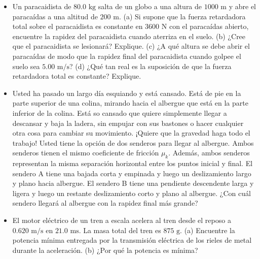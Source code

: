 \documentclass[11pt,a4paper]{article}
\begin{document}
\begin{itemize}
    \item[\textbf{14.}] Un paracaidista de $80.0 \text{ kg}$ salta de un globo a una altura de $1000 \text{ m}$ y abre el paracaídas a una altitud de $200 \text{ m}$. (a) Si supone que la fuerza retardadora total sobre el paracaidista es constante en $3600 \text{ N}$ con el paracaídas abierto, encuentre la rapidez del paracaidista cuando aterriza en el suelo. (b) ¿Cree que el paracaidista se lesionará? Explique. (c) ¿A qué altura se debe abrir el paracaídas de modo que la rapidez final del paracaidista cuando golpee el suelo sea $5.00 \text{ m/s}$? (d) ¿Qué tan real es la suposición de que la fuerza retardadora total es constante? Explique.
    \vspace*{7cm}

    \item[\textbf{15.}] Usted ha pasado un largo día esquiando y está cansado. Está de pie en la parte superior de una colina, mirando hacia el albergue que está en la parte inferior de la colina. Está so cansado que quiere simplemente llegar a descansar y baja la ladera, sin empujar con sus bastones o hacer cualquier otra cosa para cambiar su movimiento. ¡Quiere que la gravedad haga todo el trabajo! Usted tiene la opción de dos senderos para llegar al albergue. Ambos senderos tienen el mismo coeficiente de fricción $\mu_k$. Además, ambos senderos representan la misma separación horizontal entre los puntos inicial y final. El sendero A tiene una bajada corta y empinada y luego un deslizamiento largo y plano hacia albergue. El sendero B tiene una pendiente descendente larga y ligera y luego un restante deslizamiento corto y plano al albergue. ¿Con cuál sendero llegará al albergue con la rapidez final más grande?
    \vspace*{6cm}

    \item[\textbf{16.}] El motor eléctrico de un tren a escala acelera al tren desde el reposo a $0.620 \text{ m/s}$ en $21.0 \text{ ms}$. La masa total del tren es $875 \text{ g}$. (a) Encuentre la potencia mínima entregada por la transmisión eléctrica de los rieles de metal durante la aceleración. (b) ¿Por qué la potencia es mínima?
    \vspace*{6cm}
\end{itemize}

\newpage
\end{document}
